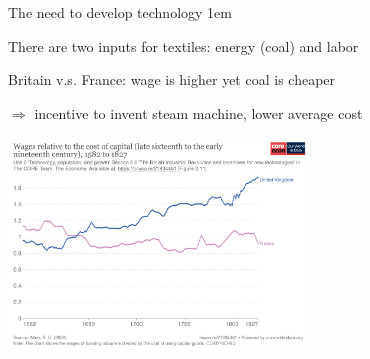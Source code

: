 \documentclass[11pt,aspectratio=43,usenames,dvipsnames]{beamer}
\let\olditemize=\itemize
\let\endolditemize=\enditemize
\renewenvironment{itemize}{\olditemize \itemsep1em}{\endolditemize}
\theoremstyle{definition}
\begin{document}
\begin{frame}{The need to develop technology}
\label{slide:The_need_to_develop_technology}
\begin{itemize}
    \item There are two inputs for textiles: energy (coal) and labor
    \item Britain v.s. France: wage is higher yet coal is cheaper
    \item $ \Rightarrow  $ \alert{incentive} to invent steam machine, lower average cost
    \begin{center}
        \includegraphics[width=0.6\textwidth]{./figures/wages-relative-to-the-cost-of-capital.png}
    \end{center}

\end{itemize}
\end{frame}
\end{document}
